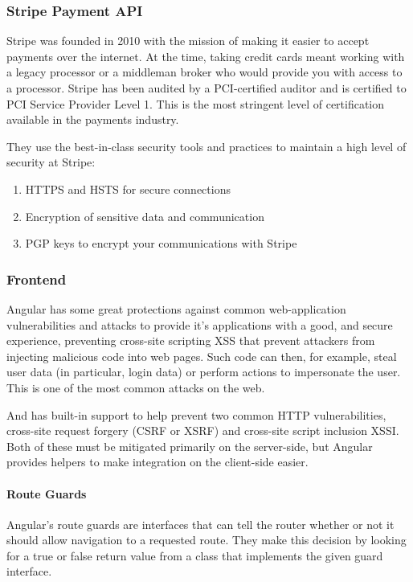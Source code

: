 \subsubsection{Stripe Payment API}
Stripe was founded in 2010 with the mission of making it easier to accept payments over the internet. At the time, taking credit cards meant working with a legacy processor or a middleman broker who would provide you with access to a processor.
Stripe has been audited by a PCI-certified auditor and is certified to PCI Service Provider Level 1. This is the most stringent level of certification available in the payments industry.

They use the best-in-class security tools and practices to maintain a high level of security at Stripe:
\begin{enumerate}
      \item HTTPS and HSTS for secure connections
      \item Encryption of sensitive data and communication
      \item PGP keys to encrypt your communications with Stripe
\end{enumerate}
\subsubsection{Frontend}
Angular has some great protections against common web-application vulnerabilities and attacks to provide it's applications with a good, and secure experience, preventing cross-site scripting \ac{XSS} that prevent attackers from injecting malicious code into web pages. Such code can then, for example, steal user data (in particular, login data) or perform actions to impersonate the user. This is one of the most common attacks on the web.

And has built-in support to help prevent two common HTTP vulnerabilities, cross-site request forgery (\ac{CSRF} or XSRF) and cross-site script inclusion \ac{XSSI}. Both of these must be mitigated primarily on the server-side, but Angular provides helpers to make integration on the client-side easier.

\paragraph*{Route Guards}
Angular’s route guards are interfaces that can tell the router whether or not it should allow navigation to a requested route. They make this decision by looking for a true or false return value from a class that implements the given guard interface.
